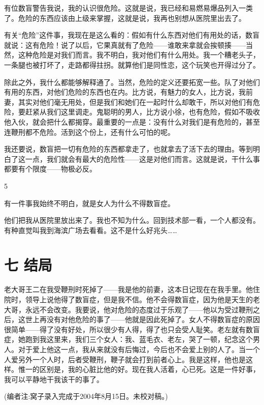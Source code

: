 有位数盲警告我说，我的认识很危险。这就是说，我已经和易燃易爆品列入一类了。危险的东西应该由上级来掌握，这就是说，我再也别想从医院里出去了。 

有关“危险”这件事，我现在是这么看的：假如有什么东西对他们有用处的话，数盲就说：这有危险！说了以后，它果真就有了危险——谁敢来拿就会挨顿揍——当然，这种危险是对我们而言。我不明白，我对他们有什么用处。我一个糟老头子，一条腿也被打坏了，走路都得拄拐。就算他们是同性恋，这个玩笑也开得过分了。 

除此之外，我什么都能够解释通了。当然，危险的定义还要拓宽一些。队了对他们有用的东西，对他们危险的东西也在内。比方说，有魅力的女人，比方说，我前妻，其实对他们毫无用处，但是我们和她们在一起时什么却敢干，所以对他们有危险，要赶紧从我们这里调走。鬼聪明的男人，比方说小徐，也有危险，假如不吸收他入伙，就会把什么都揭穿。最重要的一点是：没有什么对我们是有危险的，甚至连鞭刑都不危险。活到这个份上，还有什么可怕的呢。 

我还要说，数盲把一切有危险的东西都拿走了，也就拿去了活下去的理由。等到明白了这一点，我们就会有最大的危险性——这是对他们而言。这就是说，干什么事都要有个限度——物极必反。 



5 

有一件事我始终不明白，就是女人为什么不得数盲症。 

他们把我从医院里放出来了。我也不知为什么。回到技术部一看，一个人都没有。有种直觉叫我到海滨广场去看看。这不是什么好兆头……

\section{七 结局}

老大哥王二在我受鞭刑时死掉了——我是他的前妻，这本日记现在在我手里。他住院时，领导上说他得了数盲症，但是我不信。他不会得数盲症，因为他是天生的老大哥，永远不会改变。我要说，他对危险的态度过于乐观了——他以为受过鞭刑之后，这世上再没有对他危险的事了——他就是因此死掉了。女人不得数盲症的原因很简单——得了没有好处，所以很少有人得，得了也只会受人耻笑。老左就有数盲症，她跑到我这里来，我们三个女人：我、蓝毛衣、老左，哭了一顿，纪念这个男人。对于爱上他这一点，我从来就没有后悔过，今后也不会爱上别的人了。当一个人爱另外一个人时，后者受鞭刑，鞭子就会打到前者心上。我是这样，他也是这样。惟一的区别是，我的心脏比他的好。现在我人活着，心已死。这是一件好事，我可以平静地干我该干的事了。 


(编者注:窝子录入完成于2004年8月15日。未校对稿。)

